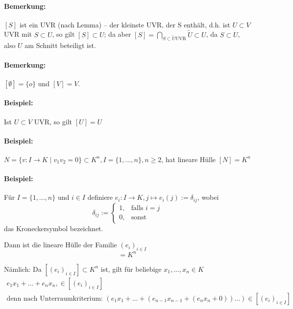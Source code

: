 \paragraph{Bemerkung:}
    $[S]$ ist ein UVR (nach Lemma) -- der \glqq kleinste\grqq{} UVR, der S enthält, d.h. ist $U\subset V$ UVR mit $S\subset U$, so gilt $[S]\subset U$; da aber $[S] = \bigcap_{S\subset \tilde{U}  \text{UVR}}\tilde{U}\subset U$,
    da $S\subset U$, also $U$ am Schnitt beteiligt ist.
    
\paragraph{Bemerkung:}
	$[\emptyset ] = \{o\}$ und $[V] = V$.
	
\paragraph{Beispiel:}
	Ist $U\subset V$ UVR, so gilt $[U] = U$
	
\paragraph{Beispiel:}
	$N=\{v:I\to K\mid v_1v_2=0\} \subset K^n,I=\{1,...,n\},n\geq 2$, hat lineare Hülle $[N]=K^n$
	
\paragraph{Beispiel:}
	Für $I=\{1,...,n\}$ und $i\in I$ definiere
	$e_i:I\to K , j\mapsto e_i(j):= \delta_{ij}$, wobei 
	\begin{equation*}
		\delta_{ij} :=
		\begin{cases}
			1,& \text{falls }i=j\\
			0,& \text{sonst}
		\end{cases}
	\end{equation*}
	das Kroneckersymbol bezeichnet.
	
	Dann ist die lineare Hülle der Familie $(e_i)_{i\in I}$
	\begin{equation*}
		[(e_i)_{i\in I}] = K^n
	\end{equation*}
	
	Nämlich: Da $[(e_i)_{i\in I}]\subset K^n$ ist, gilt für beliebige $x_1,...,x_n\in K$
	\begin{gather*}
		e_1x_1+...+e_nx_n,\in [(e_i)_{i\in I}]\\ \text{denn nach Unterraumkriterium: } (e_1x_1+...+(e_{n-1}x_{n-1}+(e_nx_n + 0))...) \in [(e_i)_{i\in I}]
	\end{gather*}
	
